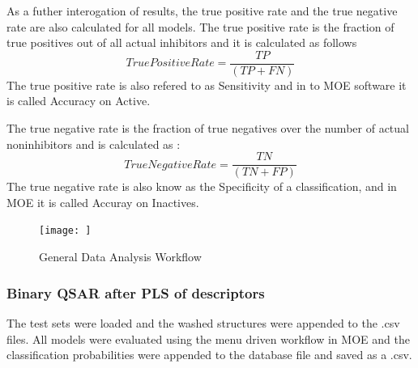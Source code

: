 As a futher interogation of results, the true positive rate and the true negative rate are also calculated for all models. The true positive rate is the fraction of true positives out of all actual inhibitors and it is calculated as follows 
$$ True Positive Rate = \frac{TP}{(TP + FN)} $$
The true positive rate is also refered to as Sensitivity and in to MOE software it is called Accuracy on Active.

The true negative rate is the fraction of true negatives over the number of actual noninhibitors and is calculated as :
$$ True Negative Rate =\frac{ TN }{(TN + FP)} $$
The true negative rate is also know as the Specificity of a classification, and in MOE it is called Accuray on Inactives.






\begin{figure}[h,t]
  \caption{General Data Analysis Workflow}
  \centering
   \texttt{[image: ]}
\end{figure}

\subsubsection{Binary QSAR after PLS of descriptors}
The test sets were loaded and the washed structures were appended to the .csv files. All models were evaluated using the menu driven workflow in MOE and the classification probabilities were appended to the database file and saved as a .csv.  

